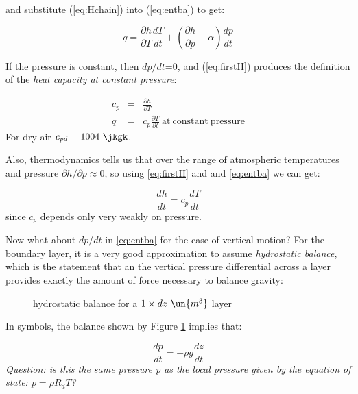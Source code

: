 \documentclass[12pt]{article}
\begin{document}
and substitute (\ref{eq:Hchain}) into (\ref{eq:entba}) to get:

\begin{equation}
  \label{eq:firstH}
  q = \frac{\partial h}{\partial T} \frac{dT}{dt} + \left ( \frac{\partial h}{\partial p} - \alpha 
                        \right ) \frac{dp}{dt}
\end{equation}


If the pressure is constant, then $dp/dt$=0, and (\ref{eq:firstH})
produces the definition of the \textit{heat capacity at constant
  pressure}:

\begin{eqnarray}
  \label{eq:hcp}
  c_p &=& \frac{\partial{h}}{\partial T}\\
  q &=& c_p \frac{\partial T}{\partial t}\ \mathrm{at\ constant\ pressure}
\end{eqnarray}
For dry air $c_{pd} = 1004\ \jkgk$.

Also, thermodynamics tells us that over the range of atmospheric
temperatures and pressure $\partial h/\partial p \approx 0$, so using
\eqref{eq:firstH} and and \eqref{eq:entba} we can get:

\begin{equation}
  \label{eq:enthal}
  \frac{dh}{dt} = c_p \frac{dT}{dt}
\end{equation}
since $c_p$ depends only very weakly on pressure.

Now what about $dp/dt$ in \eqref{eq:entba} for the case of vertical
motion?  For the boundary layer, it is a very good approximation to
assume \textit{hydrostatic balance}, which is the statement that an
the vertical pressure differential across a layer provides exactly the
amount of force necessary to balance gravity:

  \begin{figure}[H]
    \begin{center}
       
      \caption{hydrostatic balance for a $1 \times dz\  \un{m^3}$ layer}
      \label{fig:hydro}
    \end{center}
  \end{figure}

\vspace{0.1in}

In symbols, the balance shown by Figure \ref{fig:hydro} implies that:

\begin{equation}
  \label{eq:hydro}
  \frac{dp}{dt} = - \rho g \frac{dz}{dt}
\end{equation}
\textit{Question:  is this the same pressure p as the local pressure given by the equation of state: $p=\rho R_d T$?}
\end{document}
